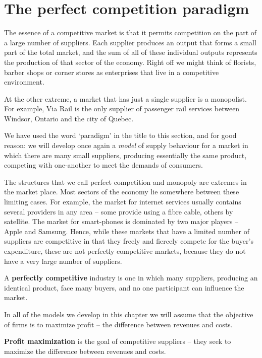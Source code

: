 \section{The perfect competition paradigm}\label{sec:ch9sec1}

The essence of a competitive market is that it permits competition on the part of a large number of suppliers. Each supplier produces an output that forms a small part of the total market, and the sum of all of these individual outputs represents the production of that sector of the economy. Right off we might think of florists, barber shops or corner stores as enterprises that live in a competitive environment. 

At the other extreme, a market that has just a single supplier is a monopolist. For example, Via Rail is the only supplier of passenger rail services between Windsor, Ontario and the city of Quebec. 

We have used the word `paradigm' in the title to this section, and for good reason: we will develop once again a \textit{model} of supply behaviour for a market in which there are many small suppliers, producing essentially the same product, competing with one-another to meet the demands of consumers. 

The structures that we call perfect competition and monopoly are extremes in the market place. Most sectors of the economy lie somewhere between these limiting cases. For example, the market for internet services usually contains several providers in any area -- some provide using a fibre cable, others by satellite. The market for smart-phones is dominated by two major players -- Apple and Samsung. Hence, while these markets that have a limited number of suppliers are competitive in that they freely and fiercely compete for the buyer's expenditure, these are not perfectly competitive markets, because they do not have a very large number of suppliers.

\begin{DefBox}
A \textbf{perfectly competitive} industry is one in which many suppliers, producing an identical product, face many buyers, and no one participant can influence the market.
\end{DefBox}

In all of the models we develop in this chapter we will assume that the objective of firms is to maximize profit -- the difference between revenues and costs.

\begin{DefBox}
\textbf{Profit maximization} is the goal of competitive suppliers -- they seek to maximize the difference between revenues and costs.
\end{DefBox}

